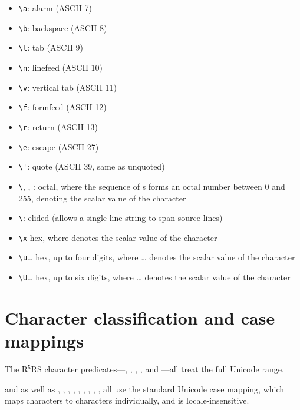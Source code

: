 \begin{itemize}
\item \verb|\a|: alarm (ASCII 7) 
\item \verb|\b|: backspace (ASCII 8) 
\item \verb|\t|: tab (ASCII 9) 
\item \verb|\n|: linefeed (ASCII 10) 
\item \verb|\v|: vertical tab (ASCII 11) 
\item \verb|\f|: formfeed (ASCII 12) 
\item \verb|\r|: return (ASCII 13) 
\item \verb|\e|: escape (ASCII 27) 
\item \verb|\'|: quote (ASCII 39, same as unquoted) 
\item \verb|\|, , :
  octal, where the sequence of s forms an octal number between
  0 and 255, denoting the scalar value of the character
\item \verb|\|: elided (allows a single-line string to
  span source lines)
\item \verb|\x| hex, where 
  denotes the scalar value of the character
\item \verb|\u|\ldots{} hex, up to four digits,
  where \ldots{} denotes the scalar value of the character
\item \verb|\U|\ldots{} hex, up to six digits,
  where \ldots{} denotes the scalar value of the character
\end{itemize}

\section{Character classification and case mappings}

The R$^5$RS character predicates---,
, ,
, and ---all treat the full
Unicode range.

 and  as well as
, , ,
, , ,
, , ,
 all use the standard Unicode case mapping, which
maps characters to characters individually, and is locale-insensitive.

